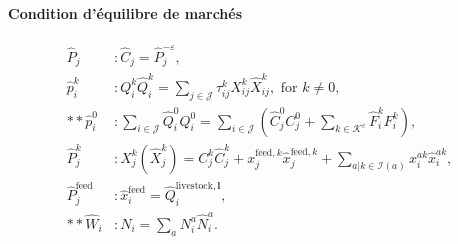 \paragraph{Condition d’équilibre de marchés}
\begin{align}
    \hat{P}_j               & : \hat{C}_j=\hat{P}_j^{-\varepsilon},                                                                                                                     \\
    \hat{p}_i^k             & : Q_i^k \hat{Q}_i^k = \sum_{j \in \mathcal{J}} \tau_{ij}^k X_{ij}^k \hat{X}_{ij}^k, \text{ for } k \neq 0,                                                \\
    ** \hat{p}_i^0          & : \sum_{i \in \mathcal{J}} \hat{Q}_i^0 Q_i^0 = \sum_{i \in \mathcal{J}} \left( \hat{C}_j^0 C_j^0  + \sum_{k \in \mathcal{K}^c} \hat{F}_i^k F_i^k \right), \\
    \hat{P}_j^k             & : X_j^k (\hat{X}_j^k) = C_j^k  \hat{C}_j^k + x_j^{\text{feed},k} \hat{x}_j^{\text{feed},k} + \sum_{a | k \in \mathcal{I}(a)} x_i^{ak} \hat{x}_i^{ak},     \\
    \hat{P}_j^{\text{feed}} & :\hat{x}_i^{\text{feed}}=\hat{Q}_i^{\text{livestock},\mathbf{l}},                                                                                         \\
    ** \hat{W}_i            & : N_i=\sum_a N_i^a \hat{N}_i^a.
\end{align}

